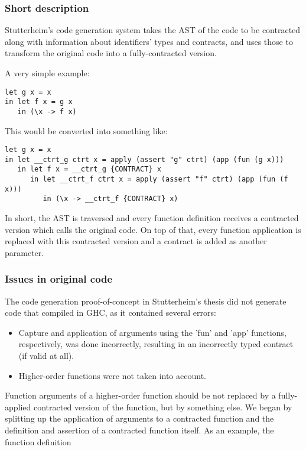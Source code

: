 \documentclass[10pt,a4paper]{article}
\begin{document}
\subsubsection{Short description}
Stutterheim's code generation system takes the AST of the code to be contracted along with information about identifiers' types and contracts, and uses those to transform the original code into a fully-contracted version.

A very simple example:

\begin{lstlisting}
let g x = x
in let f x = g x
   in (\x -> f x)
\end{lstlisting}

This would be converted into something like:

\begin{lstlisting}
let g x = x
in let __ctrt_g ctrt x = apply (assert "g" ctrt) (app (fun (g x)))
   in let f x = __ctrt_g {CONTRACT} x
      in let __ctrt_f ctrt x = apply (assert "f" ctrt) (app (fun (f x)))
         in (\x -> __ctrt_f {CONTRACT} x)
\end{lstlisting}

In short, the AST is traversed and every function definition receives a contracted version which calls the original code.
On top of that, every function application is replaced with this contracted version and a contract is added as another parameter.

\subsubsection{Issues in original code}
The code generation proof-of-concept in Stutterheim's thesis did not generate code that compiled in GHC, as it contained several errors:

\begin{itemize}
\item Capture and application of arguments using the 'fun' and 'app' functions, respectively, was done incorrectly, resulting in an incorrectly typed contract (if valid at all). 
\item Higher-order functions were not taken into account.
\end{itemize}

Function arguments of a higher-order function  should be not replaced by a fully-applied contracted version of the function, but by something else.
We began by splitting up the application of arguments to a contracted function and the definition and assertion of a contracted function itself.
As an example, the function definition
\end{document}
